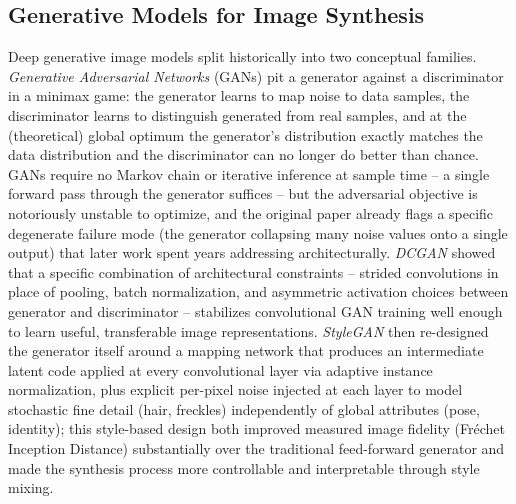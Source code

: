 \subsection{Generative Models for Image Synthesis}\label{sec:lit_generative_models}

Deep generative image models split historically into two conceptual families. \textit{Generative Adversarial Networks} (GANs) \cite{goodfellowGenerativeAdversarialNetworks2014} pit a generator against a discriminator in a minimax game: the generator learns to map noise to data samples, the discriminator learns to distinguish generated from real samples, and at the (theoretical) global optimum the generator's distribution exactly matches the data distribution and the discriminator can no longer do better than chance. GANs require no Markov chain or iterative inference at sample time -- a single forward pass through the generator suffices -- but the adversarial objective is notoriously unstable to optimize, and the original paper already flags a specific degenerate failure mode (the generator collapsing many noise values onto a single output) that later work spent years addressing architecturally. \textit{DCGAN} \cite{radfordUnsupervisedRepresentationLearning2016} showed that a specific combination of architectural constraints -- strided convolutions in place of pooling, batch normalization, and asymmetric activation choices between generator and discriminator -- stabilizes convolutional GAN training well enough to learn useful, transferable image representations. \textit{StyleGAN} \cite{karrasStyleBasedGeneratorArchitecture2019} then re-designed the generator itself around a mapping network that produces an intermediate latent code applied at every convolutional layer via adaptive instance normalization, plus explicit per-pixel noise injected at each layer to model stochastic fine detail (hair, freckles) independently of global attributes (pose, identity); this style-based design both improved measured image fidelity (Fréchet Inception Distance) substantially over the traditional feed-forward generator and made the synthesis process more controllable and interpretable through style mixing.

